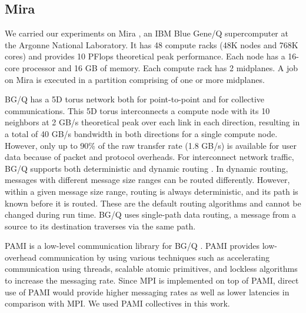 \subsection{Mira}
\label{sec:system}

We carried our experiments on Mira \cite{Chen:BGQ}, an IBM Blue Gene/Q supercomputer at the Argonne National Laboratory. It has 48 compute racks (48K nodes and 768K cores) and provides 10 PFlops theoretical peak performance. Each node has a 16-core processor and 16 GB of memory. Each compute rack has 2 midplanes. A job on Mira is executed in a partition comprising of one or more midplanes. 

BG/Q has a 5D torus network both for point-to-point and for collective communications. This 5D torus interconnects a compute node with its 10 neighbors at 2 GB/s theoretical peak over each link in each direction, resulting in a total of 40 GB/s bandwidth in both directions for a single compute node. However, only up to 90\% of the raw transfer rate (1.8 GB/s) is available for user data because of packet and protocol overheads.  
For interconnect network traffic, BG/Q supports both deterministic and dynamic routing \cite{Chen:BGQ}. In dynamic routing, messages with different message size ranges can be routed differently. However, within a given message size range, routing is always deterministic, and its path is known before it is routed. These are the default routing algorithms and cannot be changed during run time. BG/Q uses single-path data routing, a message from a source to its destination traverses via the same path.

PAMI is a low-level communication library for BG/Q \cite{PAMI:Kumar}. PAMI provides low-overhead communication by using various techniques such as accelerating communication using threads, scalable atomic primitives, and lockless algorithms to increase the messaging rate. Since MPI is implemented on top of PAMI, direct use of PAMI would provide higher messaging rates as well as lower latencies in comparison with MPI. We used PAMI collectives in this work.

